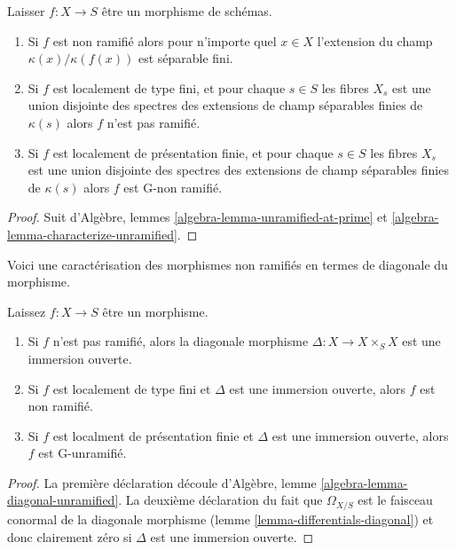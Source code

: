 \begin{lemma}

\label{lemma-unramified-etale-fibres}

Laisser $f : X \to S$ être un morphisme de schémas.

\begin{enumerate}

\item Si $f$ est non ramifié alors pour n'importe quel $x \in X$ l'extension du champ
$\kappa(x)/\kappa(f(x))$ est séparable fini.
\item Si $f$ est localement de type fini, et pour chaque
$s \in S$ les fibres $X_s$ est une union disjointe des spectres des extensions de champ séparables finies de $\kappa(s)$ alors $f$ n'est pas ramifié.
\item Si $f$ est localement de présentation finie, et pour chaque
$s \in S$ les fibres $X_s$ est une union disjointe des spectres des extensions de champ séparables finies de $\kappa(s)$ alors $f$ est G-non ramifié.

\end{enumerate}

\end{lemma}

\begin{proof}
Suit d'Algèbre, lemmes \ref{algebra-lemma-unramified-at-prime} et \ref{algebra-lemma-characterize-unramified}.
\end{proof}

\noindent
Voici une caractérisation des morphismes non ramifiés en termes de diagonale du morphisme.

\begin{lemma}

\label{lemma-diagonal-unramified-morphism}
Laissez $f : X \to S$ être un morphisme.
\begin{enumerate}
\item Si $f$ n'est pas ramifié, alors la diagonale morphisme $\Delta : X \to X \times_S X$ est une immersion ouverte.
\item Si $f$ est localement de type fini et $\Delta$ est une immersion ouverte, alors $f$ est non ramifié.
\item Si $f$ est localment de présentation finie et $\Delta$ est une immersion ouverte, alors $f$ est G-unramifié.
\end{enumerate}

\end{lemma}

\begin{proof}

La première déclaration découle d'Algèbre, lemme \ref{algebra-lemma-diagonal-unramified}. La deuxième déclaration du fait que $\Omega_{X/S}$
est le faisceau conormal de la diagonale morphisme (lemme \ref{lemma-differentials-diagonal}) et donc clairement zéro si $\Delta$ est une immersion ouverte.

\end{proof}

